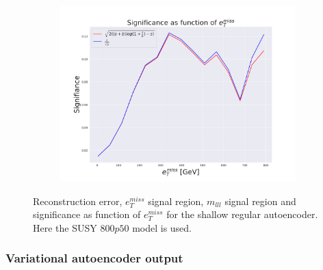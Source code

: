 \begin{figure}[H]
    \hfill  
    \begin{subfigure}{.40\textwidth}
        \includegraphics[width=\textwidth]{Figures/AE_testing/small/2lep/significance_etmiss_800p0p050_-0.805852780573614.pdf}
        \caption{}
        \label{fig:AE_2lep_small_signi_800_3}
    \end{subfigure}
    \hfill      
    \caption[2lep shallow network | $800p50$ | AE | 3]{Reconstruction error, $e_T^{miss}$ signal region, $m_{lll}$ signal region and significance as function of 
    $e_T^{miss}$ for the shallow regular autoencoder. Here the SUSY $800p50$ model is used.}
    \label{fig:AE_2lep_small_rec_sig_signi_800_3}
\end{figure}




\subsubsection*{Variational autoencoder output}